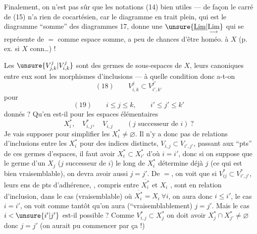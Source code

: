  Finalement, on n'est pas sûr que les notations (14)  bien utiles — de  façon le carré de (15) n'a rien de cocartésien, car le diagramme en trait plein, qui est le diagramme ``somme''
des diagrammes 17, donne une $\unsure{\underline{\mathrm{Lim}}|\underset{\longrightarrow}{\mathrm{Lim}}}$ qui se représente de $=$ comme espace somme, a peu de chances d'être homéo. à $X$ (p. ex. si $X$ conn\ldots) !

Les $\unsure{V_{j,k}^j|V_{i,k}^j}$ sont des germes de sous-espaces de $X$, leurs    canoniques entre eux sont les morphismes d'inclusions — à quelle condition donc a-t-on
\[
(18)\qquad V_{i,k}^j\subset V_{i',k'}^{j'}
\]
pour
\[
(19)\qquad i\leq j\leq k,\qquad i'\leq j'\leq k'
\]
donnés ? Qu'en est-il pour les espaces élémentaires
\[
X_i^*,\quad V_{i,j}^*,\quad V_{i,j}\qquad(j\text{ successeur de }i)\ ?
\]
Je vais supposer pour simplifier les $X_i^*\ne\varnothing$.
Il n'y a donc pas de relations d'inclusions entre les $X_i^*$ pour des indices distincts,   $V_{i,j}\subset V_{i',j'}$, passant aux ``pts''  de ces germes d'espaces, il faut avoir $X_i^*\subset X_{i'}^*$ d'où $i=i'$, donc si on suppose que le germe d'un $X_j$ ($j$ successeur de $i$) le long de $X_i^*$ détermine déjà $j$ (ce qui est bien vraisemblable), on devra avoir aussi $j=j'$. De $=$, on voit que si $V_{ij}^*\subset V_{i',j'}^*$, leurs ens de pts d'adhérence, , compris entre $\overline{X_i^*}$ et $X_i$ , sont en relation d'inclusion,
dans le cas (vraisemblable) où $\overline{X_i^*}=X_i\ \forall i$, on aura donc $i\leq i'$,  le cas $i=i'$, on voit comme tantôt qu'on aura (``vraisemblablement) $j=j'$. Mais le cas $i<\unsure{i'|j'}$ est-il possible ? Comme $V_{i,j}^*\subset X_j^*$  on doit avoir $X_j^*\cap X_{j'}^*\ne\varnothing$ donc $j=j'$ (on aurait pu commencer par ça !)

